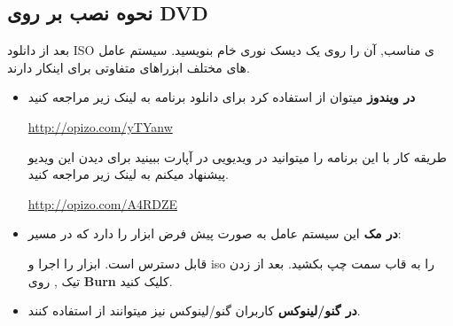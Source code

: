 \subsection{نحوه نصب بر روی DVD}\label{se-211}
بعد از دانلود ISO ی 
مناسب, آن را روی یک دیسک نوری خام بنویسید. سیستم عامل های مختلف ابزراهای متفاوتی برای اینکار دارند.
\begin{itemize}
	\item \textbf{در ویندوز}\label{amozesh-windows1}
	میتوان از
	استفاده کرد برای دانلود برنامه به لینک زیر مراجعه کنید
	\begin{flushleft}
		\href{http://shatelland.com/key/34533}{http://opizo.com/yTYanw}
	\end{flushleft}
طریقه کار با این برنامه را میتوانید در ویدیویی در آپارت ببینید برای دیدن این ویدیو پیشنهاد میکنم به لینک زیر مراجعه کنید.
\begin{flushleft}
	\href{https://www.aparat.com/v/46xJD/%D8%A2%D9%85%D9%88%D8%B2%D8%B4_ultra_iso}{http://opizo.com/A4RDZE}
\end{flushleft}
\item \textbf{در مک}\label{amozesh-mac1}
این سیستم عامل به صورت پیش فرض ابزار
را دارد که در مسیر:
\begin{flushleft}
\end{flushleft}
قابل دسترس است. ابزار
را اجرا و iso را به قاب سمت چپ بکشید. بعد از زدن تیک 
, روی 
\textbf{Burn} 
کلیک کنید.
\item \textbf{در گنو/لینوکس}\label{amozesh-gnu-linux1}
کاربران گنو/لینوکس نیز میتوانند از
استفاده کنند.
\end{itemize}
